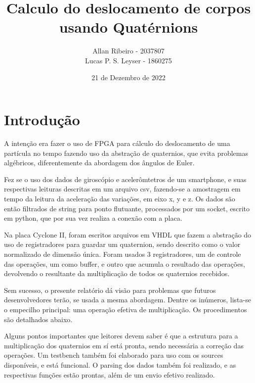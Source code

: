 \documentclass [12pt,oneside] {article}
\begin{document}

\title {Calculo do deslocamento de corpos usando Quatérnions}

\author{
Allan Ribeiro - 2037807\\
Lucas P. S. Leyser - 1860275\\
}

\date {21 de Dezembro de 2022}

\maketitle



\section{Introdução}


	A intenção era fazer o uso de FPGA para cálculo do
deslocamento de uma partícula no tempo fazendo uso da abstração de
quaternios, que evita problemas algébricos, diferentemente da
abordagem dos ângulos de Euler.

	Fez se o uso dos dados de giroscópio e acelerômtetros de um
smartphone, e suas respectivas leituras descritas em um arquivo csv, 
fazendo-se a amostragem em tempo da leitura da aceleração das variações, 
em eixo x, y e z. Os dados são então filtrados de string para ponto flutuante, 
processados por um socket, escrito em python, que por sua vez realiza 
a conexão com a placa.

	Na placa Cyclone II, foram escritos arquivos em VHDL que fazem
a abstração do uso de registradores para guardar um quaternion, sendo
descrito como o valor normalizado de dimensão única. Foram usados 3
registradores, um de controle das operações, um como buffer, e outro que acumula o resultado das operações, devolvendo o resultante da multiplicação de todos os quaternios recebidos.

	Sem sucesso, o presente relatório dá visão para problemas que
futuros desenvolvedores terão, se usada a mesma abordagem. Dentre os
inúmeros, lista-se o empecilho principal: uma operação efetiva de
multiplicação. Os procedimentos são detalhados abaixo.

	Alguns pontos importantes que leitores devem saber é que a
estrutura para a multiplicação dos quaternios em sí está pronta,
sendo necessária a correção das operações. Um testbench também foi
elaborado para uso com os sources disponíveis, e está funcional. O
parsing dos dados também foi realizado, e as respectivas funções estão
prontas, além de um envio efetivo realizado.
\end{document}
